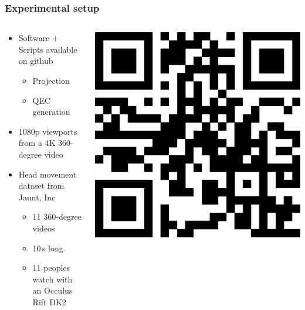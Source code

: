 \begin{frame}[c]
   \frametitle{Experimental setup}

   \begin{columns}[T]
     \begin{column}{0.65\linewidth}
        \begin{itemize}
            \item Software + Scripts available on github
            \begin{itemize}
               \item Projection
               \item QEC generation
            \end{itemize}
            \item 1080p viewports from a 4K 360-degree video
            \item Head movement dataset from Jaunt, Inc
            \begin{itemize}
               \item 11 360-degree videos
               \item 10\,s long
               \item 11 peoples watch with an Occulus Rift DK2
            \end{itemize}
         \end{itemize}
      \end{column}
      \begin{column}{0.35\linewidth}
         \includegraphics[scale=0.25]{plots/pictures/Xavier/githubQRC.eps}
      \end{column}
   \end{columns}

\end{frame}

